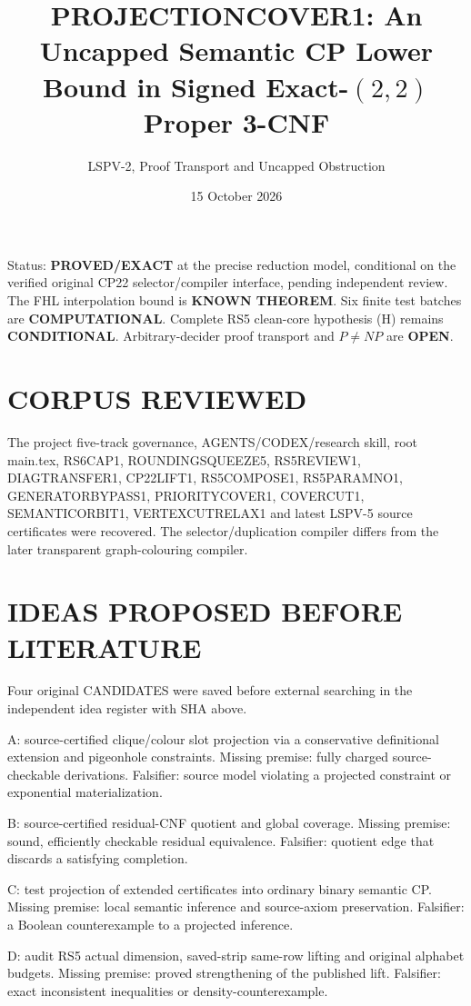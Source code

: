 \documentclass[11pt]{article}
\title{PROJECTIONCOVER1: An Uncapped Semantic CP Lower Bound in Signed Exact-$(2,2)$ Proper 3-CNF}
\author{LSPV-2, Proof Transport and Uncapped Obstruction}
\date{15 October 2026}
\begin{document}
\maketitle
\noindent Status: \textbf{PROVED/EXACT} at the precise reduction model, conditional on the verified original CP22 selector/compiler interface, pending independent review. The FHL interpolation bound is \textbf{KNOWN THEOREM}. Six finite test batches are \textbf{COMPUTATIONAL}. Complete RS5 clean-core hypothesis (H) remains \textbf{CONDITIONAL}. Arbitrary-decider proof transport and $P\ne NP$ are \textbf{OPEN}.

\section{CORPUS REVIEWED}
The project five-track governance, AGENTS/CODEX/research skill, root main.tex, RS6CAP1, ROUNDINGSQUEEZE5, RS5REVIEW1, DIAGTRANSFER1, CP22LIFT1, RS5COMPOSE1, RS5PARAMNO1, GENERATORBYPASS1, PRIORITYCOVER1, COVERCUT1, SEMANTICORBIT1, VERTEXCUTRELAX1 and latest LSPV-5 source certificates were recovered. The selector/duplication compiler differs from the later transparent graph-colouring compiler.

\section{IDEAS PROPOSED BEFORE LITERATURE}
Four original CANDIDATES were saved before external searching in the independent idea register with SHA above.

\noindent A: source-certified clique/colour slot projection via a conservative definitional extension and pigeonhole constraints. Missing premise: fully charged source-checkable derivations. Falsifier: source model violating a projected constraint or exponential materialization.

\noindent B: source-certified residual-CNF quotient and global coverage. Missing premise: sound, efficiently checkable residual equivalence. Falsifier: quotient edge that discards a satisfying completion.

\noindent C: test projection of extended certificates into ordinary binary semantic CP. Missing premise: local semantic inference and source-axiom preservation. Falsifier: a Boolean counterexample to a projected inference.

\noindent D: audit RS5 actual dimension, saved-strip same-row lifting and original alphabet budgets. Missing premise: proved strengthening of the published lift. Falsifier: exact inconsistent inequalities or density-counterexample.
\end{document}
